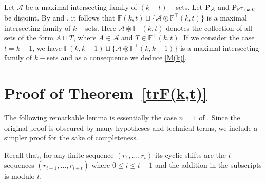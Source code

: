 \documentclass[a4paper,reqno,10pt]{amsart}
\theoremstyle{definition}
\begin{document}
Let $\mathcal{A}$ be a maximal intersecting family of $(k-t)-$sets. Let ${\ensuremath{{\textnormal{P}}}}_{\mathcal{A}}$ and ${\ensuremath{{\textnormal{P}}}}_{\mathbb{F}^{\top}(k.t)}$ be disjoint. By \cite[Proposition~3.4]{aX14111480} and \cite[Theorem~2.7]{aX14111480}, it follows that $\mathbb{F}(k,t)\sqcup\{\mathcal{A}\circledast\mathbb{F}^{\top}(k,t)\}$ is a maximal intersecting family of $k-$sets. Here $\mathcal{A}\circledast\mathbb{F}^{\top}(k,t)$ denotes the collection of all sets of the form $A\sqcup T$, where $A\in\mathcal{A}$ and $T\in\mathbb{F}^{\top}(k,t)$. If we consider the case $t=k-1$, we have  $\mathbb{F}(k,k-1)\sqcup\{\mathcal{A}\circledast\mathbb{F}^{\top}(k,k-1)\}$ is a maximal intersecting family of $k-$sets and as a consequence we deduce \eqref{M(k)}.

\section{Proof of Theorem~\ref{trF(k,t)}}

The following remarkable lemma is essentially the case $n=1$ of \cite[Theorem~2.1]{MR0114765}. Since the original proof is obscured by many hypotheses and technical terms, we include a simpler proof for the sake of completeness.

Recall that, for any finite sequence $(r_{1},\ldots,r_{t})$ its cyclic shifts are the $t$ sequences $(r_{i+1},\ldots,r_{i+t})$ where $0\leq i\leq t-1$ and the addition in the subscripts is modulo $t$.
\end{document}
